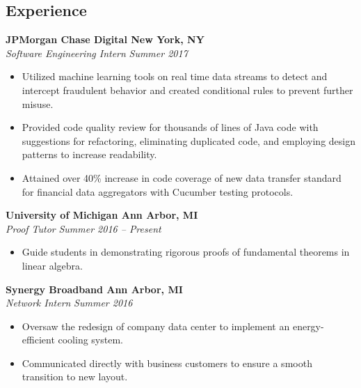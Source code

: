 \documentclass[margin,line]{resume}
\begin{document}
\begin{resume}
\sectionbreak
\vspace{-2.5mm}
    \section{\mysidestyle Experience}
    
    \textbf{JPMorgan Chase Digital \hfill New York, NY} \\\vspace{1mm}%
    \textsl{Software Engineering Intern} \hfill \textsl{Summer 2017}
    \begin{itemize}
    \item Utilized machine learning tools on real time data streams to detect and intercept fraudulent behavior and created conditional rules to prevent further misuse. 
    \item Provided code quality review for thousands of lines of Java code with suggestions for refactoring, eliminating duplicated code, and employing design patterns to increase readability.
    \item Attained over 40\% increase in code coverage of new data transfer standard for financial data aggregators with Cucumber testing protocols.
    \end{itemize}

    \vspace{-2.5mm}
    \textbf{University of Michigan \hfill Ann Arbor, MI} \\\vspace{1mm}%
    \textsl{Proof Tutor} \hfill \textsl{Summer 2016 -- Present}
    \begin{itemize}
    \item Guide students in demonstrating rigorous proofs of fundamental theorems in linear algebra.
    \end{itemize}

    \vspace{-2.5mm}
    \textbf{Synergy Broadband \hfill Ann Arbor, MI} \\\vspace{1mm}%
    \textsl{Network Intern} \hfill \textsl{Summer 2016}
    \begin{itemize}
    \item Oversaw the redesign of company data center to implement an energy-efficient cooling system.
    \item Communicated directly with business customers to ensure a smooth transition to new layout. 
    \end{itemize}


\end{resume}
\end{document}
